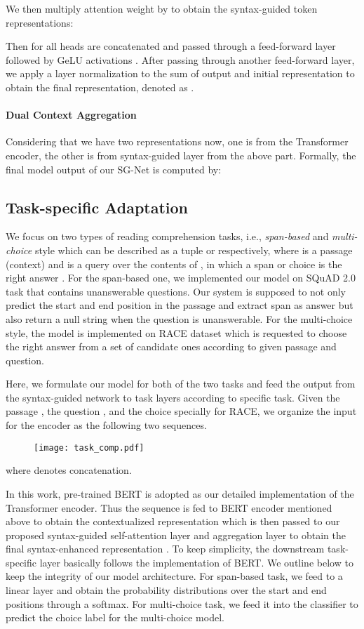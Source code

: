 \documentclass[letterpaper]{article} \usepackage{color}
\begin{document}
We then multiply attention weight  by  to obtain the syntax-guided token representations:

Then  for all heads are concatenated and passed through a feed-forward layer followed by GeLU activations \cite{hendrycks2016bridging}. After passing through another feed-forward layer, we apply a layer normalization to the sum of output and initial representation to obtain the final representation, denoted as .




\paragraph{Dual Context Aggregation}
 Considering that we have two representations now, one is   from the Transformer encoder, the other is  from syntax-guided layer from the above part. Formally, the final model output of our SG-Net  is computed by:


\subsection{Task-specific Adaptation} \label{mrc_models}
We focus on two types of reading comprehension tasks, i.e., \emph{span-based} and \emph{multi-choice} style which can be described as a tuple  or  respectively, where  is a passage (context) and  is a query over the contents of , in which a span or choice  is the right answer . For the span-based one, we implemented our model on SQuAD 2.0 task that contains unanswerable questions. Our system is supposed to not only predict the start and end position in the passage  and extract span as answer  but also return a null string when the question is unanswerable. For the multi-choice style, the model is implemented on RACE dataset which is requested to choose the right answer from a set of candidate ones according to given passage and question.

Here, we formulate our model for both of the two tasks and feed the output from the syntax-guided network to task layers according to specific task. Given the passage , the question , and the choice  specially for RACE, we organize the input  for the encoder as the following two sequences.

\begin{figure}[htb]
	\centering
	\texttt{[image: task\_comp.pdf]}
\end{figure}
\noindent where  denotes concatenation. 

In this work, pre-trained BERT is adopted as our detailed implementation of the Transformer encoder. Thus the sequence is fed to BERT encoder mentioned above to obtain the contextualized representation  which is then passed to our proposed syntax-guided self-attention layer and aggregation layer to obtain the final syntax-enhanced representation . To keep simplicity, the downstream task-specific layer basically follows the implementation of BERT. We outline below to keep the integrity of our model architecture. For span-based task, we feed  to a linear layer and obtain the probability distributions over the start and end positions through a softmax. For multi-choice task, we feed it into the classifier to predict the choice label for the multi-choice model.
\end{document}
